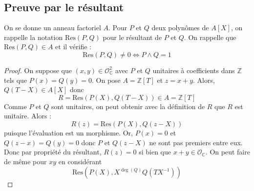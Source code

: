 \documentclass[french]{article}
\newcommand{\Z}{\mathbb{Z}}
\newcommand{\C}{\mathbb{C}}
\newcommand{\inv}{^{-1}}
\theoremstyle{definition}
\theoremstyle{theorem}
\theoremstyle{remark}
\begin{document}
\subsection{Preuve par le résultant}
On se donne un anneau factoriel $A$. Pour $P$ et $Q$ deux polynômes de $A[X]$, on rappelle la notation $\text{Res}(P,Q)$ pour le résultant de $P$ et $Q$. On rappelle que $\text{Res}(P,Q)\in A$ et il vérifie : $$\text{Res}(P,Q)\ne 0\iff P\wedge Q=1$$
\begin{proof}
	On suppose que $(x,y)\in\mathcal{O}_\C^2$ avec $P$ et $Q$ unitaires à coefficients dans $\Z$ tels que $P(x)=Q(y)=0$. On pose $A=\Z[T]$ et $z=x+y$. Alors, $Q(T-X)\in A[X]$ donc $$R=\text{Res}(P(X),Q(T-X))\in A=\Z[T]$$ Comme $P$ et $Q$ sont unitaires, on peut obtenir avec la définition de $R$ que $R$ est unitaire. Alors : $$R(z)=\text{Res}(P(X),Q(z-X))$$ puisque l'évaluation est un morphisme. Or, $P(x)=0$ et $Q(z-x)=Q(y)=0$ donc $P$ et $Q(z-X)$ ne sont pas premiers entre eux. Donc par propriété du résultant, $R(z)=0$ si bien que $x+y\in\mathcal{O}_\C$. On peut faire de même pour $xy$ en considérant $$\text{Res}(P(X),X^{\deg(Q)}Q(TX\inv))$$ 
\end{proof}
\end{document}
